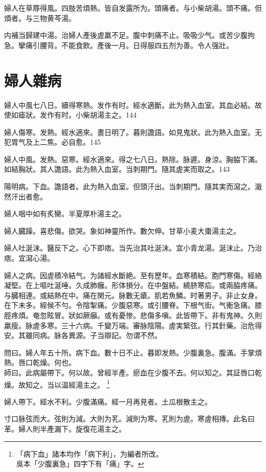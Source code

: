 \documentclass[12pt,twoside,UTF8,b5paper]{ctexbook}
\begin{document}
婦人在草蓐得風。四肢苦煩熱。皆自发露所为。頭痛者。与小柴胡湯。頭不痛。但煩者。与三物黄芩湯。

内補当歸建中湯。治婦人產後虗羸不足。腹中刺痛不止。吸吸少气。或苦少腹拘急。攣痛引腰背。不能食飲。產後一月。日得服四五剂为善。令人强壯。

\chapter{婦人雜病}

婦人中風七八日。續得寒熱。发作有时。經水適斷。此为熱入血室。其血必結。故使如瘧狀。发作有时。小柴胡湯主之。144

婦人傷寒。发熱。經水適來。晝日明了。暮則譫語。如見鬼狀。此为熱入血室。无犯胃气及上二焦。必自愈。145

婦人中風。发熱。惡寒。經水適來。得之七八日。熱除。脉遲。身涼。胸脇下滿。如結胸狀。其人譫語。此为熱入血室。当刺期門。隨其{虗}実而取之。143

陽明病。下血。譫語者。此为熱入血室。但頭汗出。当刺期門。隨其実而瀉之。濈然汗出者愈。

婦人咽中如有炙臠。半夏厚朴湯主之。

婦人臓躁。喜悲傷。欲哭。象如神靈所作。數欠伸。甘{草小}麦大棗湯主之。

婦人吐涎沫。醫反下之。心下即痞。当先治其吐涎沫。宜小青龙湯。涎沫止。乃治痞。宜瀉心湯。

婦人之病。因虗積冷結气。为諸經水斷絶。至有歷年。血寒積結。胞門寒傷。經絡凝堅。在上嘔吐涎唾。久成肺癰。形体損分。在中盤結。繞脐寒疝。或兩脇疼痛。与臓相連。或結熱{在}中。痛在関元。脉數无瘡。肌若魚鱗。时著男子。非止女身。在下未多。經候不勻。令陰掣痛。少腹惡寒。或引腰脊。下根气街。气衝急痛。膝脛疼煩。奄忽眩冒。狀如厥癲。或有憂惨。悲傷多嗔。此皆帶下。非有鬼神。久則羸瘦。脉虗多寒。三十六病。千變万端。審脉陰陽。虗実緊弦。行其針藥。治危得安。其雖同病。脉各異源。子当辯記。勿谓不然。

問曰。婦人年五十所。病下血。數十日不止。暮即发熱。少腹裏急。腹滿。手掌煩熱。唇口乾燥。何也。\\
師曰。此病屬帶下。何以故。曾經半產。瘀血在少腹不去。何以知之。其証唇口乾燥。故知之。当以温經湯主之。
	\footnote{「病下血」諸本均作「病下利」，为編者所改。\\吳本「少腹裏急」四字下有「痛」字。}

{婦人}帶下。經水不利。少腹滿痛。經一月再見者。土瓜根散主之。

寸口脉弦而大。弦則为減。大則为芤。減則为寒。芤則为虗。寒虗相摶。此名曰革。婦人則半產漏下。旋復花湯主之。
\end{document}
